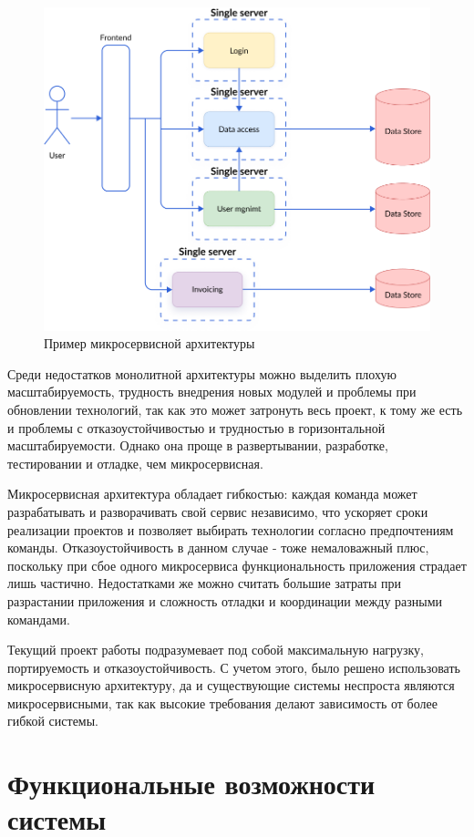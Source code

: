 \begin{figure}
  \centering
  \includegraphics[width=.9\textwidth]{graphics/img/micro.png}
  \caption{Пример микросервисной архитектуры}
  \label{fig:micro}
\end{figure}

Среди недостатков монолитной архитектуры можно выделить плохую масштабируемость, трудность внедрения новых модулей и проблемы при обновлении технологий, так как это может затронуть весь проект, к тому же есть и проблемы с отказоустойчивостью и трудностью в горизонтальной масштабируемости. Однако она проще в развертывании, разработке, тестировании и отладке, чем микросервисная.

Микросервисная архитектура обладает гибкостью: каждая команда может разрабатывать и разворачивать свой сервис независимо, что ускоряет сроки реализации проектов и позволяет выбирать технологии согласно предпочтениям команды. Отказоустойчивость в данном случае - тоже немаловажный плюс, поскольку при сбое одного микросервиса функциональность приложения страдает лишь частично. Недостатками же можно считать большие затраты при разрастании приложения и сложность отладки и координации между разными командами.

Текущий проект работы подразумевает под собой максимальную нагрузку, портируемость и отказоустойчивость. С учетом этого, было решено использовать микросервисную архитектуру, да и существующие системы неспроста являются микросервисными, так как высокие требования делают зависимость от более гибкой системы.

\section{Функциональные возможности системы}

